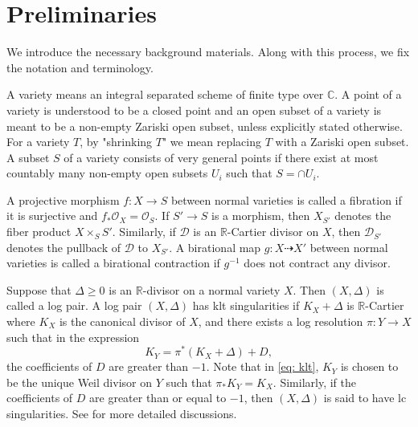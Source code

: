 \documentclass[11pt,oneside,reqno]{amsart}
\numberwithin{equation}{section}
\theoremstyle{definition}
\newcommand{\bC}{\mathbb{C}}
\newcommand{\bR}{\mathbb{R}}
\newcommand{\mD}{\mathcal{D}}
\newcommand{\mO}{\mathcal{O}}
\begin{document}
\section{Preliminaries}\label{sec: pre}

We introduce the necessary background materials. Along with this process, we fix the notation and terminology. 

A variety means an integral separated scheme of finite type over $\bC$. A point of a variety is understood to be a closed point and an open subset of a variety is meant to be a non-empty Zariski open subset, unless explicitly stated otherwise. For a variety $T$, by "shrinking $T$" we mean replacing $T$ with a Zariski open subset. A subset $S$ of a variety consists of very general points if there exist at most countably many non-empty open subsets $U_i$ such that $S = \cap U_i$.

A projective morphism $f: X \to S$ between normal varieties is called a fibration if it is surjective and $f_*\mO_X=\mO_S$. If $S' \to S$ is a morphism, then $X_{S'}$ denotes the fiber product $X \times_{S}S'$. Similarly, if $\mD$ is an $\bR$-Cartier divisor on $X$, then $\mD_{S'}$ denotes the pullback of $\mD$ to $X_{S'}$. A birational map $g: X \dasharrow X'$ between normal varieties is called a birational contraction if $g^{-1}$ does not contract any divisor.


Suppose that $\Delta \geq 0$ is an $\bR$-divisor on a normal variety $X$. Then $(X,\Delta)$ is called a log pair. A log pair $(X,\Delta)$ has klt singularities if $K_X+\Delta$ is $\bR$-Cartier where $K_X$ is the canonical divisor of $X$, and there exists a log resolution $\pi: Y \to X$ such that in the expression
\begin{equation}\label{eq: klt}
    K_Y=\pi^*(K_X+\Delta)+D,
\end{equation}
the coefficients of $D$ are greater than $-1$. Note that in \eqref{eq: klt}, $K_Y$ is chosen to be the unique Weil divisor on $Y$ such that $\pi_*K_Y=K_X$. Similarly, if the coefficients of $D$ are greater than or equal to $-1$, then $(X,\Delta)$ is said to have lc singularities. See \cite[\S 2.3]{KM98} for more detailed discussions. 
\end{document}
